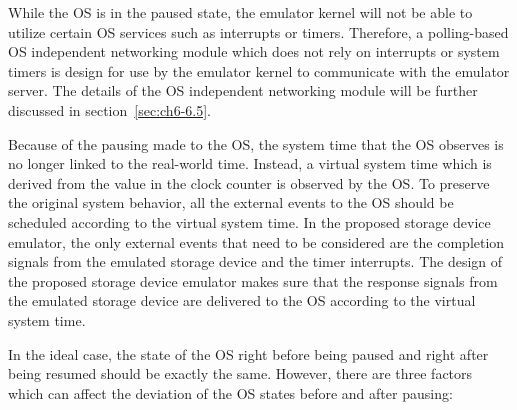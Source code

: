 While the OS is in the paused state, the emulator kernel will not be able to utilize certain OS services such as interrupts or timers. Therefore, a polling-based OS independent networking module which does not rely on interrupts or system timers is design for use by the emulator kernel to communicate with the emulator server. The details of the OS independent networking module will be further discussed in section~\ref{sec:ch6-6.5}.

Because of the pausing made to the OS, the system time that the OS observes is no longer linked to the real-world time. Instead, a virtual system time which is derived from the value in the clock counter is observed by the OS. To preserve the original system behavior, all the external events to the OS should be scheduled according to the virtual system time. In the proposed storage device emulator, the only external events that need to be considered are the completion signals from the emulated storage device and the timer interrupts. The design of the proposed storage device emulator makes sure that the response signals from the emulated storage device are delivered to the OS according to the virtual system time.

In the ideal case, the state of the OS right before being paused and right after being resumed should be exactly the same. However, there are three factors which can affect the deviation of the OS states before and after pausing:

